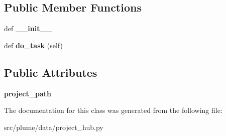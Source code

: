 \subsection*{Public Member Functions}
\begin{DoxyCompactItemize}
\item 
def {\bfseries \+\_\+\+\_\+init\+\_\+\+\_\+}\hypertarget{classplume-creator_1_1src_1_1plume_1_1data_1_1project__hub_1_1_load_project_a3e17ced0a6eddfa915f33633de9d98bc}{}\label{classplume-creator_1_1src_1_1plume_1_1data_1_1project__hub_1_1_load_project_a3e17ced0a6eddfa915f33633de9d98bc}

\item 
def {\bfseries do\+\_\+task} (self)\hypertarget{classplume-creator_1_1src_1_1plume_1_1data_1_1project__hub_1_1_load_project_a8c13088a23530383c0dc2d67d22235de}{}\label{classplume-creator_1_1src_1_1plume_1_1data_1_1project__hub_1_1_load_project_a8c13088a23530383c0dc2d67d22235de}

\end{DoxyCompactItemize}
\subsection*{Public Attributes}
\begin{DoxyCompactItemize}
\item 
{\bfseries project\+\_\+path}\hypertarget{classplume-creator_1_1src_1_1plume_1_1data_1_1project__hub_1_1_load_project_a833850dd7ba76c8b8ed337159142b0da}{}\label{classplume-creator_1_1src_1_1plume_1_1data_1_1project__hub_1_1_load_project_a833850dd7ba76c8b8ed337159142b0da}

\end{DoxyCompactItemize}


The documentation for this class was generated from the following file\+:\begin{DoxyCompactItemize}
\item 
src/plume/data/project\+\_\+hub.\+py\end{DoxyCompactItemize}
